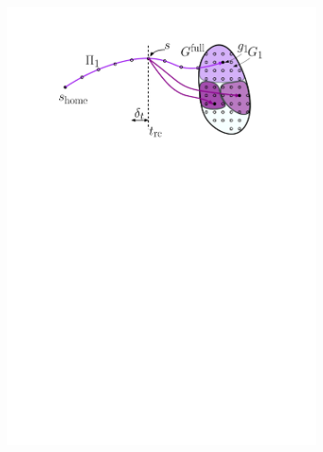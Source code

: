 \documentclass[conference]{IEEEtran}
\begin{document}
\begin{figure}[t]
\begin{subfigure}{0.225\textwidth}
        \includegraphics[width=\textwidth]{pre2}
        \caption{}
        \label{fig:pre2}
    \end{subfigure} 
    \begin{subfigure}{0.225\textwidth}

\end{subfigure}
\end{figure}
\end{document}
